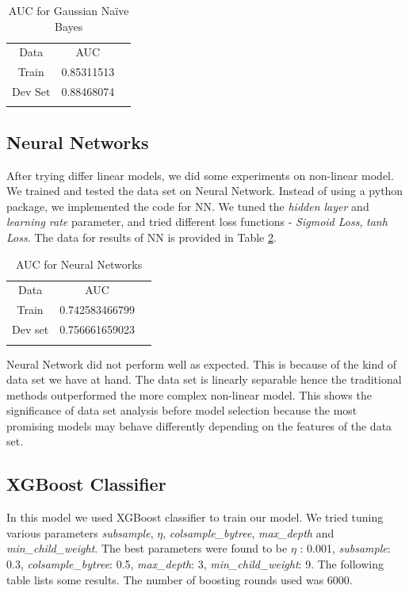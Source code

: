 \documentclass[conference]{IEEEtran}
\numberwithin{equation}{section}
\numberwithin{figure}{section}
\numberwithin{table}{section}
\begin{document}
\begin{table}[!htb]
 \centering
 \caption{AUC for Gaussian Na{\"i}ve Bayes}
 \label{nb_tab}
\begin{tabular}{ c c c } 
	    \noalign{\smallskip}\hline\noalign{\smallskip}
		Data & AUC \\
    	   \noalign{\smallskip}\hline\noalign{\smallskip}
		Train &  0.85311513\\
		Dev Set & 0.88468074\\
		\noalign{\smallskip}\hline\noalign{\smallskip}
  \end{tabular} 
\end{table}

\subsection{Neural Networks}
After trying differ linear models, we did some experiments on non-linear model. We trained and tested the data set on Neural Network. Instead of using a python package, we implemented the code for NN. We tuned the \textit{hidden layer} and \textit{learning rate} parameter,  and tried different loss functions - \textit{Sigmoid Loss}, \textit{tanh Loss}. The data for results of NN is provided in Table \ref{tab_nn}.

\begin{table}[!htb]
 \centering
 \caption{AUC for Neural Networks}
 \label{tab_nn}
\begin{tabular}{ c c c } 
	    \noalign{\smallskip}\hline\noalign{\smallskip}
		Data &  AUC \\
    	   \noalign{\smallskip}\hline\noalign{\smallskip}
		Train &  0.742583466799\\
		Dev set &  0.756661659023\\
				\noalign{\smallskip}\hline\noalign{\smallskip}
  \end{tabular} 
\end{table}

Neural Network did not perform well as expected. This is because of the kind of data set we have at hand. The data set is linearly separable hence the traditional methods outperformed the more complex non-linear model. This shows the significance of data set analysis before model selection because the most promising models may behave differently depending on the features of the data set.  

\subsection{XGBoost Classifier}
In this model we used XGBoost classifier to train our model. We tried tuning various parameters \textit{subsample}, \textit{$\eta$}, \textit{colsample\_bytree}, \textit{max\_depth} and \textit{min\_child\_weight}. The best parameters were found to be \textit{$\eta$} : 0.001, \textit{subsample}: 0.3, \textit{colsample\_bytree}: 0.5, \textit{max\_depth}: 3, \textit{min\_child\_weight}: 9. The following table lists some results.  The number of boosting rounds used was 6000.
 
\end{document}
